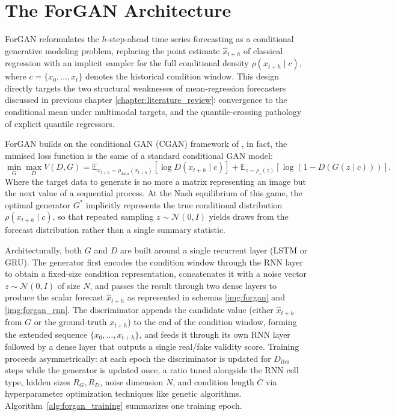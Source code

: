 \section{The ForGAN Architecture}
\label{sec:forgan}

ForGAN \cite{background:forgan} reformulates the $h$-step-ahead time series forecasting as a conditional generative modeling problem,
replacing the point estimate $\hat{x}_{t+h}$ of classical regression with an implicit sampler for the full conditional density $\rho(x_{t+h} \mid c)$, where $c = \{x_0, \dots, x_t\}$ denotes the historical condition window. 
This design directly targets the two structural weaknesses of 
mean-regression forecasters discussed in previous chapter \ref{chapter:literature_review}: convergence to the conditional mean under multimodal targets, and the quantile-crossing pathology of explicit quantile regressors.

ForGAN builds on the conditional GAN (CGAN) framework of \cite{background:cgan}, 
in fact, the mimised loss function is the same of a standard conditional GAN model:
\begin{equation*}
\min_G \max_D V(D,G) = \mathbb{E}_{x_{t+h} \sim \rho_{\text{data}}(x_{t+h})}[\log D(x_{t+h} \mid c)] + \mathbb{E}_{z \sim \rho_z(z)}[\log(1 - D(G(z \mid c)))].
\end{equation*}
Where the target data to generate is no more a matrix representing an image but the next value of a sequential process.
At the Nash equilibrium of this game, the optimal generator $G^*$ implicitly represents the true conditional distribution 
$\rho(x_{t+h}\mid c)$, so that repeated sampling $z \sim \mathcal{N}(0, I)$ yields draws from the forecast distribution rather than a single summary statistic.

Architecturally, both $G$ and $D$ are built around a single recurrent layer (LSTM or GRU). 
The generator first encodes the condition window through the RNN layer to 
obtain a fixed-size condition representation, 
concatenates it with a noise vector 
$z \sim \mathcal{N}(0, I)$ of size $N$, 
and passes the result through two dense 
layers to produce the scalar forecast $\hat{x}_{t+h}$ as represented in schemas \ref{img:forgan} and \ref{img:forgan_rnn}. 
The discriminator appends the candidate value (either $\hat{x}_{t+h}$ from $G$ or the ground-truth $x_{t+h}$) 
to the end of the condition window, 
forming the extended sequence $\{x_0,\dots,x_{t+h}\}$, 
and feeds it through its own RNN layer followed by a dense 
layer that outputs a single real/fake validity score. 
Training proceeds asymmetrically: at each epoch the discriminator 
is updated for $D_{\text{iter}}$ steps while the generator
 is updated once, a ratio tuned alongside the RNN cell type, 
 hidden sizes $R_G, R_D$, noise dimension $N$, and condition length $C$ via hyperparameter optimization techniques like genetic algorithms. 
 Algorithm~\ref{alg:forgan_training} summarizes one training epoch.


